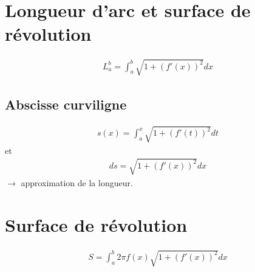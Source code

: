 \section{Longueur d'arc et surface de révolution}
\begin{eqnarray}
	L_a^b=\int_a^b\sqrt{1+(f'(x))^2}dx
\end{eqnarray}
\subsection{Abscisse curviligne}
\begin{eqnarray}
	s(x)=\int_a^x\sqrt{1+(f'(t))^2}dt
\end{eqnarray}
et
\begin{eqnarray}
	ds=\sqrt{1+(f'(x))^2}dx
\end{eqnarray}
$\rightarrow$ approximation de la longueur.

\section{Surface de révolution}
\begin{eqnarray}
	S=\int_a^b2\pi f(x)\sqrt{1+(f'(x))^2}dx
\end{eqnarray}